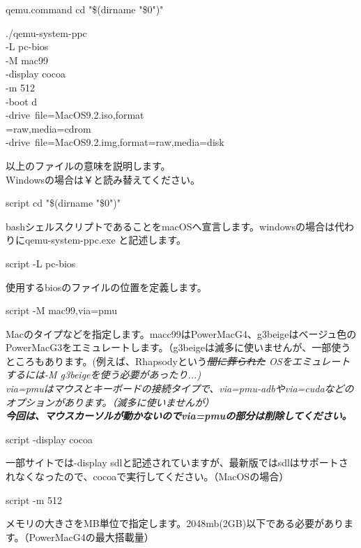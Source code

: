 \documentclass[b5paper,9pt,platex,dvipdfmx]{jsarticle}
\begin{document}
\begin{multicols*}{3}
\begin{itembox}{qemu.command}
cd "\$(dirname "\$0")"

./qemu-system-ppc \ \\
-L pc-bios \ \\
-M mac99 \ \\
-display cocoa \ \\
-m 512 \ \\
-boot d \ \\
-drive\ file=MacOS9.2.iso,format\\
=raw,media=cdrom \ \\
-drive\ file=MacOS9.2.img,format=raw,media=disk \\
\end{itembox}
以上のファイルの意味を説明します。\\
Windowsの場合は￥と読み替えてください。\\
\begin{itembox}{script}
cd "\$(dirname "\$0")"\\
\end{itembox}
bashシェルスクリプトであることをmacOSへ宣言します。windowsの場合は代わりにqemu-system-ppc.exe と記述します。\\
\begin{itembox}{script}
-L pc-bios
\end{itembox}
使用するbiosのファイルの位置を定義します。\\
\begin{itembox}{script}
-M mac99,via=pmu 
\end{itembox}
Macのタイプなどを指定します。macc99はPowerMacG4、g3beigeはベージュ色のPowerMacG3をエミュレートします。（g3beigeは滅多に使いませんが、一部使うところもあります。(例えば、Rhapsodyという\it  \sout{闇に葬られた} \sc OSをエミュレートするには-M g3beigeを使う必要があったり...)\\
via=pmuはマウスとキーボードの接続タイプで、via=pmu-adbやvia=cudaなどのオプションがあります。（滅多に使いませんが）\\
\textbf{今回は、マウスカーソルが動かないのでvia=pmuの部分は削除してください。}\\
\begin{itembox}{script}
-display cocoa 
\end{itembox}
一部サイトでは-display sdlと記述されていますが、最新版ではsdlはサポートされなくなったので、cocoaで実行してください。（MacOSの場合）\\
\begin{itembox}{script}
-m 512 
\end{itembox}
メモリの大きさをMB単位で指定します。2048mb(2GB)以下である必要があります。（PowerMacG4の最大搭載量）\\

\end{multicols*}
\end{document}
